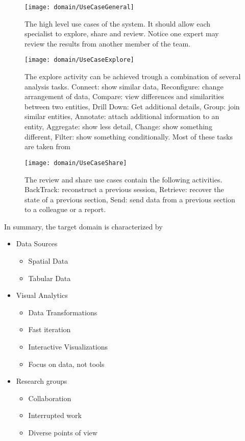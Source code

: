 \begin{figure}
\centering
\texttt{[image: domain/UseCaseGeneral]}
\caption{The high level use cases of the system. It should allow each specialist to explore, share and review. Notice one expert may review the results from another member of the team.\label{fig_use_case_general}}
\end{figure}

\begin{figure}
\centering
\texttt{[image: domain/UseCaseExplore]}
\caption{The explore activity can be achieved trough a combination of several analysis tasks. Connect: show similar data, Reconfigure: change arrangement of data, Compare: view differences and similarities between two entities, Drill Down: Get additional details, Group: join similar entities, Annotate: attach additional information to an entity, Aggregate: show less detail, Change: show something different, Filter: show something conditionally. Most of these tasks are taken from \autocite{yi_toward_2007}\label{fig_use_case_explore}}
\end{figure}

\begin{figure}
\centering
\texttt{[image: domain/UseCaseShare]}
\caption{The review and share use cases contain the following activities. BackTrack: reconstruct a previous session, Retrieve: recover the state of a previous section, Send: send data from a previous section to a colleague or a report.\label{fig_use_case_share}}
\end{figure}

\bigskip

In summary, the target domain is characterized by
\begin{itemize}
\item Data Sources
\begin{itemize}
\item Spatial Data
\item Tabular Data
\end{itemize}
\item Visual Analytics
\begin{itemize}
\item Data Transformations
\item Fast iteration
\item Interactive Visualizations
\item Focus on data, not tools
\end{itemize}
\item Research groups
\begin{itemize}
\item Collaboration
\item Interrupted work
\item Diverse points of view
\end{itemize}
\end{itemize}

